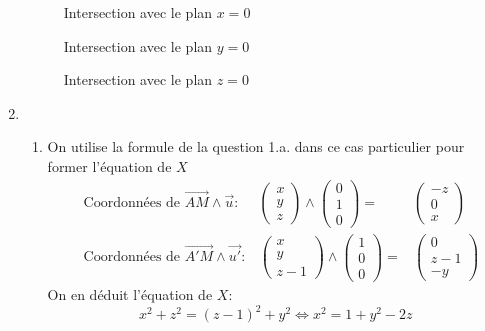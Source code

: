 \begin{enumerate}
\begin{figure}[ht]
 \centering

\caption{Intersection avec le plan $x=0$}
\label{fig:Csurfbiss_1}
\end{figure}
\begin{figure}[ht]
 \centering

\caption{Intersection avec le plan $y=0$}
\label{fig:Csurfbiss_2}
\end{figure}
\begin{figure}[ht]
 \centering

\caption{Intersection avec le plan $z=0$}
\label{fig:Csurfbiss_3}
\end{figure}
\item \begin{enumerate}
 \item On utilise la formule de la question 1.a. dans ce cas particulier pour former l'équation de $X$
\begin{align*}
 &\text{Coordonnées de }\overrightarrow{AM}\wedge \overrightarrow{u} :&
\begin{pmatrix}
 x\\y\\z
\end{pmatrix}
 \wedge
\begin{pmatrix}
 0\\1\\0
\end{pmatrix}
=&
\begin{pmatrix}
 -z\\0\\x
\end{pmatrix}
\\
 &\text{Coordonnées de }\overrightarrow{A'M}\wedge \overrightarrow{u'} :&
\begin{pmatrix}
 x\\y\\z-1
\end{pmatrix}
 \wedge
\begin{pmatrix}
 1\\0\\0
\end{pmatrix}
=&
\begin{pmatrix}
 0\\z-1\\-y
\end{pmatrix}
\end{align*}
On en déduit l'équation de $X$:
\begin{displaymath}
 x^2+z^2=(z-1)^2+y^2 \Leftrightarrow
x^2=1+y^2-2z
\end{displaymath}

\end{enumerate}
\end{enumerate}
